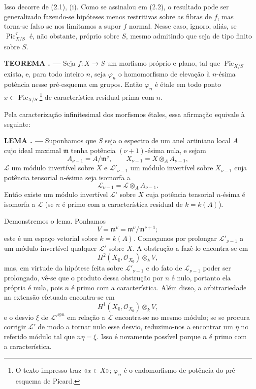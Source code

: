 \documentclass[11pt,twoside,openany]{book}
\numberwithin{equation}{section}
\newcommand{\src}[1]{%
  \phantomsection\hypertarget{src:#1}{}%
  \marginpar{\raggedleft\footnotesize\sffamily #1}%
}
\theoremstyle{plain}
\theoremstyle{definition}
\theoremstyle{remark}
\newcommand{\result}[2]{%
  \par\medskip\noindent\textbf{#1%
  \if\relax\detokenize{#2}\relax\else\space#2\fi. ---}\enspace
}
\newcommand{\FgaUnitKey}{frontmatter}
\renewcommand{\src}[1]{%
  \phantomsection\hypertarget{src:\FgaUnitKey:#1}{}%
  \marginpar{\raggedleft\footnotesize\sffamily #1}%
}
\begin{document}
Isso decorre de (2.1), (i). Como se assinalou em (2.2), o resultado pode ser
generalizado fazendo-se hipóteses menos restritivas sobre as fibras de $f$, mas
torna-se falso se nos limitamos a supor $f$ normal. Nesse caso, ignoro, aliás,
se $\operatorname{Pic}_{X/S}^\tau$ é, não obstante, próprio sobre $S$, mesmo
admitindo que seja de tipo finito sobre $S$.
\src{233}
\result{TEOREMA}{2.5} Seja $f:X\longrightarrow S$ um morfismo próprio e plano,
tal que $\operatorname{Pic}_{X/S}$ exista, e, para todo inteiro $n$, seja
$\varphi_n$ o homomorfismo de elevação à $n$-ésima potência nesse pré-esquema
em grupos. Então $\varphi_n$ é étale em todo ponto
$x\in\operatorname{Pic}_{X/S}$\footnote{O texto impresso traz «$x\in X$»;
$\varphi_n$ é o endomorfismo de potência do pré-esquema de Picard.} de
característica residual prima com $n$.

Pela caracterização infinitesimal dos morfismos étales, essa afirmação equivale
à seguinte:

\result{LEMA}{2.6} Suponhamos que $S$ seja o espectro de um anel artiniano local
$A$ cujo ideal maximal $\mathfrak m$ tenha potência $(\nu+1)$-ésima nula, e
sejam
\[
A_{\nu-1}=A/\mathfrak m^\nu,
\qquad X_{\nu-1}=X\otimes_A A_{\nu-1},
\]
$\mathcal L$ um módulo invertível sobre $X$ e $\mathcal L'_{\nu-1}$ um módulo
invertível sobre $X_{\nu-1}$ cuja potência tensorial $n$-ésima seja isomorfa a
\[
\mathcal L_{\nu-1}=\mathcal L\otimes_A A_{\nu-1}.
\]
Então existe um módulo invertível $\mathcal L'$ sobre $X$ cuja potência
tensorial $n$-ésima é isomorfa a $\mathcal L$ (se $n$ é primo com a
característica residual de $k=k(A)$).

Demonstremos o lema. Ponhamos
\[
V=\mathfrak m^\nu=\mathfrak m^\nu/\mathfrak m^{\nu+1} ;
\]
este é um espaço vetorial sobre $k=k(A)$. Começamos por prolongar
$\mathcal L'_{\nu-1}$ a um módulo invertível qualquer $\mathcal L'$ sobre $X$.
A obstrução a fazê-lo encontra-se em
\[
H^2(X_0,\mathcal O_{X_0})\otimes_k V,
\]
mas, em virtude da hipótese feita sobre $\mathcal L'_{\nu-1}$ e do fato de
$\mathcal L_{\nu-1}$ poder ser prolongado, vê-se que o produto dessa obstrução
por $n$ é nulo, portanto ela própria é nula, pois $n$ é primo com a
característica. Além disso, a arbitrariedade na extensão efetuada encontra-se
em
\[
H^1(X_0,\mathcal O_{X_0})\otimes_k V,
\]
e o desvio $\xi$ de $\mathcal L'^{\otimes n}$ em relação a $\mathcal L$
encontra-se no mesmo módulo; se se procura corrigir $\mathcal L'$ de modo a
tornar nulo esse desvio, reduzimo-nos a encontrar um $\eta$ no referido módulo
tal que $n\eta=\xi$. Isso é novamente possível porque $n$ é primo com a
característica.
\end{document}
